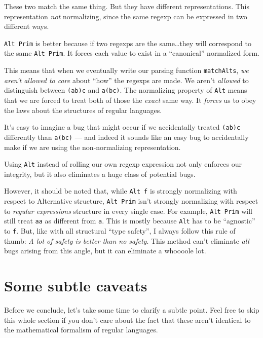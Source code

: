 \documentclass[]{article}
\begin{document}
These two match the same thing. But they have different representations. This
representation \emph{not} normalizing, since the same regexp can be expressed in
two different ways.

\texttt{Alt\ Prim} is better because if two regexps are the same\ldots they will
correspond to the same \texttt{Alt\ Prim}. It forces each value to exist in a
``canonical'' normalized form.

This means that when we eventually write our parsing function
\texttt{matchAlts}, \emph{we aren't allowed to care} about ``how'' the regexps
are made. We aren't \emph{allowed} to distinguish between
\texttt{(a\textbar{}b)\textbar{}c} and \texttt{a\textbar{}(b\textbar{}c)}. The
normalizing property of \texttt{Alt} means that we are forced to treat both of
those the \emph{exact} same way. It \emph{forces} us to obey the laws about the
structures of regular languages.

It's easy to imagine a bug that might occur if we accidentally treated
\texttt{(a\textbar{}b)\textbar{}c} differently than
\texttt{a\textbar{}(b\textbar{}c)} --- and indeed it sounds like an easy bug to
accidentally make if we are using the non-normalizing representation.

Using \texttt{Alt} instead of rolling our own regexp expression not only
enforces our integrity, but it also eliminates a huge class of potential bugs.

However, it should be noted that, while \texttt{Alt\ f} is strongly normalizing
with respect to Alternative structure, \texttt{Alt\ Prim} isn't strongly
normalizing with respect to \emph{regular expressions} structure in every single
case. For example, \texttt{Alt\ Prim} will still treat \texttt{a\textbar{}a} as
different from \texttt{a}. This is mostly because \texttt{Alt} has to be
``agnostic'' to \texttt{f}. But, like with all structural ``type safety'', I
always follow this rule of thumb: \emph{A lot of safety is better than no
safety}. This method can't eliminate \emph{all} bugs arising from this angle,
but it can eliminate a whoooole lot.

\section{Some subtle caveats}\label{some-subtle-caveats}

Before we conclude, let's take some time to clarify a subtle point. Feel free to
skip this whole section if you don't care about the fact that these aren't
identical to the mathematical formalism of regular languages.
\end{document}

